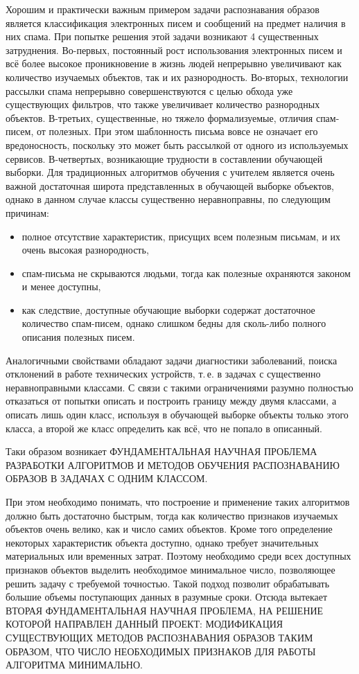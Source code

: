 \documentclass[12pt]{article}
\begin{document}
	Хорошим и практически важным примером задачи распознавания образов является классификация электронных писем и сообщений на предмет наличия в них спама. 
	При попытке решения этой задачи возникают 4 существенных затруднения. 
	Во-первых, постоянный рост использования электронных писем и всё более высокое проникновение в жизнь людей непрерывно увеличивают как количество изучаемых объектов, так и их разнородность.
	Во-вторых, технологии рассылки спама непрерывно совершенствуются с целью обхода уже существующих фильтров, что также увеличивает количество разнородных объектов.
	В-третьих, существенные, но тяжело формализуемые, отличия спам-писем, от полезных. 
	При этом шаблонность письма вовсе не означает его вредоносность, поскольку это может быть рассылкой от одного из используемых сервисов.
	В-четвертых, возникающие трудности в составлении обучающей выборки. Для традиционных алгоритмов обучения с учителем является очень важной достаточная широта представленных в обучающей выборке объектов, однако в данном случае классы существенно неравноправны, по следующим причинам:
	\begin{itemize}
	 	\item полное отсутствие характеристик, присущих всем полезным письмам, и их очень высокая разнородность,
	 	\item спам-письма не скрываются людьми, тогда как полезные охраняются законом и менее доступны,
	 	\item как следствие, доступные обучающие выборки содержат достаточное количество спам-писем, однако слишком бедны для сколь-либо полного описания полезных писем.
	\end{itemize}

	Аналогичными свойствами обладают задачи диагностики заболеваний, поиска отклонений в работе технических устройств, т.\,е. в задачах с существенно неравноправными классами.
	С связи с такими ограничениями разумно полностью отказаться от попытки описать и построить границу между двумя классами, а описать лишь один класс, используя в обучающей выборке объекты только этого класса, а второй же класс определить как всё, что не попало в описанный.

	Таки образом возникает \MakeTextUppercase{фундаментальная научная проблема разработки алгоритмов и методов обучения распознаванию образов в задачах с одним классом.}

	При этом необходимо понимать, что построение и применение таких алгоритмов должно быть достаточно быстрым, тогда как количество признаков изучаемых объектов очень велико, как и число самих объектов. 
	Кроме того определение некоторых характеристик объекта доступно, однако требует значительных материальных или временных затрат. 
	Поэтому необходимо среди всех доступных признаков объектов выделить необходимое минимальное число, позволяющее решить задачу с требуемой точностью. Такой подход позволит обрабатывать большие объемы поступающих данных в разумные сроки.
	Отсюда вытекает \MakeTextUppercase{вторая фундаментальная научная проблема, на решение которой направлен данный проект: модификация существующих методов распознавания образов таким образом, что число необходимых признаков для работы алгоритма минимально.}
\end{document}

